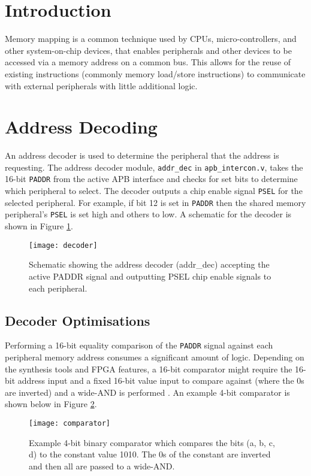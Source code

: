 \section{Introduction}
Memory mapping is a common technique used by CPUs, micro-controllers, and other system-on-chip devices, that enables peripherals and other devices to be accessed via a memory address on a common bus. This allows for the reuse of existing instructions (commonly memory load/store instructions) to communicate with external peripherals with little additional logic.

\section{Address Decoding}
An address decoder is used to determine the peripheral that the address is requesting. The address decoder module, \verb|addr_dec| in \verb|apb_intercon.v|, takes the 16-bit \verb|PADDR| from the active APB interface and checks for set bits to determine which peripheral to select. The decoder outputs a chip enable signal \verb|PSEL| for the selected peripheral. For example, if bit 12 is set in \verb|PADDR| then the shared memory peripheral's \verb|PSEL| is set high and others to low. A schematic for the decoder is shown in Figure \ref{fig:decoder}.

\begin{figure}[H]
\centering
\texttt{[image: decoder]}
\caption{Schematic showing the address decoder (addr\_dec) accepting the active PADDR signal and outputting PSEL chip enable signals to each peripheral.}
\label{fig:decoder}
\end{figure}

\subsection{Decoder Optimisations}
Performing a 16-bit equality comparison of the \verb|PADDR| signal against each peripheral memory address consumes a significant amount of logic. Depending on the synthesis tools and FPGA features, a 16-bit comparator might require the 16-bit address input and a fixed 16-bit value input to compare against (where the 0s are inverted) and a wide-AND is performed \cite{palchaudhuri2015high,salauyou2015designing}. An example 4-bit comparator is shown below in Figure \ref{fig:comparator}.

\begin{figure}[H]
\centering
\texttt{[image: comparator]}
\caption{Example 4-bit binary comparator which compares the bits (a, b, c, d) to the constant value 1010. The 0s of the constant are inverted and then all are passed to a wide-AND.}
\label{fig:comparator}
\end{figure}

